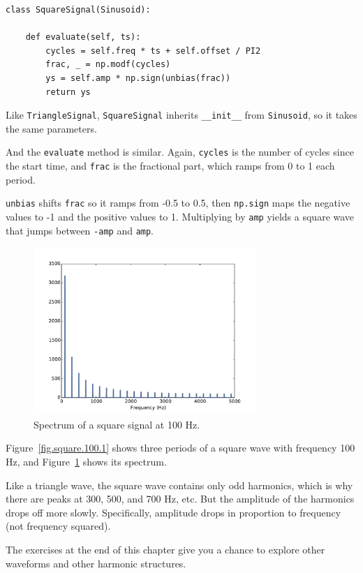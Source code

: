 \documentclass[12pt]{book}
\begin{document}
\begin{verbatim}
class SquareSignal(Sinusoid):
    
    def evaluate(self, ts):
        cycles = self.freq * ts + self.offset / PI2
        frac, _ = np.modf(cycles)
        ys = self.amp * np.sign(unbias(frac))
        return ys
\end{verbatim}

Like {\tt TriangleSignal}, {\tt SquareSignal} inherits 
\verb"__init__" from {\tt Sinusoid}, so it takes the same
parameters.

And the {\tt evaluate} method is similar.  Again, {\tt cycles} is
the number of cycles since the start time, and {\tt frac} is the
fractional part, which ramps from 0 to 1 each period.

{\tt unbias} shifts {\tt frac} so it ramps from -0.5 to 0.5,
then {\tt np.sign} maps the negative values to -1 and the
positive values to 1.  Multiplying by {\tt amp} yields a square
wave that jumps between {\tt -amp} and {\tt amp}.

\begin{figure}
\centerline{\includegraphics[height=2.5in]{figs/square-100-2.pdf}}
\caption{Spectrum of a square signal at 100 Hz.}
\label{fig.square.100.2}
\end{figure}

Figure~\ref{fig.square.100.1} shows three periods of a square
wave with frequency 100 Hz,
and Figure~\ref{fig.square.100.2} shows its spectrum.

Like a triangle wave, the square wave contains only odd harmonics,
which is why there are peaks at 300, 500, and 700 Hz, etc.
But the amplitude of the harmonics drops off more slowly.
Specifically, amplitude drops in proportion to frequency (not frequency
squared).

The exercises at the end of this chapter give you a chance to
explore other waveforms and other harmonic structures.
\end{document}
